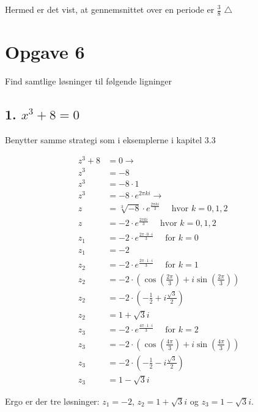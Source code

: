 \documentclass[a4paper, 12pt]{article}
\begin{document}
Hermed er det vist, at gennemsnittet over en periode er \(\frac{3}{8}\) \(\triangle\)

\section*{Opgave 6}
\label{sec:orgd0e58f0}

Find samtlige løsninger til følgende ligninger

\subsection*{1. \(x^3+8=0\)}
\label{sec:orga3514e3}

Benytter samme strategi som i eksemplerne i kapitel 3.3

\begin{align*}
    z^3 +8 &= 0 \to \\
    z^3 &= -8  \\
    z^3 &= -8\cdot 1  \\
    z^3 &= -8\cdot e^{2 \pi k i}\to  \\
    z &= \sqrt[3]{-8}\cdot e^{\frac{2 \pi k i}{3}}  \quad \text{ hvor } k=0,1,2 \\
    z &= -2\cdot e^{\frac{2 \pi k i}{3}}  \quad \text{ hvor } k=0,1,2 \\
    z_1 &= -2\cdot e^{\frac{2 \pi \cdot 0 \cdot  i}{3}}  \quad \text{ for } k=0 \\
    z_1 &= -2 \\
    z_2 &= -2 \cdot e^{\frac{2 \pi \cdot 1 \cdot  i}{3}}  \quad \text{ for } k=1 \\ 
    z_2 &= -2 \cdot \left( \cos\left(\frac{2\pi}{3}\right) + i \sin\left(\frac{2\pi}{3}\right)\right)\\ 
    z_2 &= -2 \cdot \left( -\frac{1}{2} + i \frac{\sqrt{3}}{2}\right)\\ 
    z_2 &= 1 + \sqrt{3}i \\
    z_3 &= -2 \cdot e^{\frac{4 \pi \cdot 1 \cdot  i}{3}}  \quad \text{ for } k=2 \\ 
    z_3 &= -2 \cdot \left( \cos\left(\frac{4\pi}{3}\right) + i \sin\left(\frac{4\pi}{3}\right)\right)\\ 
    z_3 &= -2 \cdot \left( -\frac{1}{2} - i \frac{\sqrt{3}}{2}\right)\\ 
    z_3 &= 1 - \sqrt{3}i 
\end{align*}

Ergo er der tre løsninger: \(z_1=-2\), \(z_2 = 1+\sqrt{3}i\) og \(z_3=1-\sqrt{3}i\).
\end{document}
